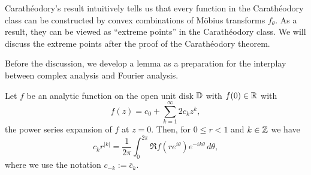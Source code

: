 \documentclass{../../small}
\begin{document}
Carath\'eodory's result intuitively tells us that every function in the Carath\'eodory class can be constructed by convex combinations of M\"obius transforms $f_\theta$.
As a result, they can be viewed as ``extreme points'' in the Carath\'eodory class.
We will discuss the extreme points after the proof of the Carath\'eodory theorem.

Before the discussion, we develop a lemma as a preparation for the interplay between complex analysis and Fourier analysis.

\begin{lem}
Let $f$ be an analytic function on the open unit disk $\mathbb{D}$ with $f(0)\in\mathbb{R}$ with
\[f(z)=c_0+\sum_{k=1}^\infty2c_kz^k,\]
the power series expansion of $f$ at $z=0$.
Then, for $0\le r<1$ and $k\in\mathbb{Z}$ we have
\[c_kr^{|k|}=\frac1{2\pi}\int_0^{2\pi}\Re f(re^{i\theta})e^{-ik\theta}\,d\theta,\]
where we use the notation $c_{-k}:=\bar c_k$.
\end{lem}
\end{document}
